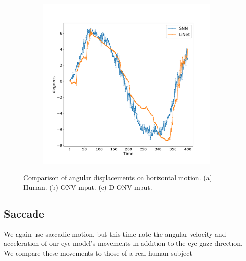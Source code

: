 \documentclass [MS] {UCLAthesis}
\begin{document}
\begin{figure}
\begin{subfigure}{0.3\textwidth}
        \caption{}
        \label{fig:smooth_lateral_normal}
    \end{subfigure}
    \hfill
    \begin{subfigure}{0.3\textwidth}
        \centering
        \includegraphics[width=\textwidth]{smooth_lateral_delta}
        \caption{}
        \label{fig:smooth_lateral_delta}
    \end{subfigure}
    \caption[Angular displacements from sinusoidal motion, compared to a human subject.]{Comparison of angular displacements on horizontal motion. (a) Human. (b) ONV input. (c) D-ONV input.}
    \label{fig:smooth_lateral}
\end{figure}


\subsection{Saccade}

We again use saccadic motion, but this time note the angular velocity and acceleration of our eye model's movements in addition to the eye gaze direction. We compare these movements to those of a real human subject.
\end{document}
